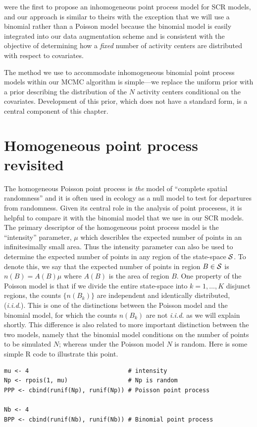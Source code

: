 \citet{borchers_efford:2008} were the first to propose an
inhomogeneous point process model for SCR models, and our approach is
similar to theirs with the exception that we will use a binomial
rather than a Poisson model because the binomial model is
easily integrated into our data augmentation scheme and is consistent
with the objective of determining how a {\it fixed} number of activity
centers are distributed with respect to covariates.

The method we use to accommodate inhomogeneous binomial point process
models within our MCMC algorithm is simple---we
replace the uniform prior with a prior describing the
distribution of
the $N$ activity centers conditional on the covariates. Development of
this prior, which does not have a
standard form, is a central component of this chapter.


\section{Homogeneous point process revisited}

The homogeneous Poisson point process is \emph{the} model of ``complete
spatial randomness'' and it is often used in ecology as a null model
to test for departures from randomness. Given its central role in the
analysis of point procesess, it is helpful to compare it with
the binomial model that we use in our SCR models. The
primary descriptor of the homogeneous point process model is the
``intensity'' parameter, $\mu$ which describles the expected number
of points in an infinitesimally small area. Thus the intensity
parameter can also be used to determine the expected number of points
in any region of the state-space $\cal{S}$. To denote this, we say
that the expected number of points in region $B \in \cal{S}$ is
$n(B) = A(B)\mu$ where $A(B)$ is the area of region $B$.  One property
of the Poisson model is that if we divide the entire state-space into
$k=1,\dots,K$ disjunct regions, the counts $\{n(B_k)\}$ are
independent and identically distributed, ({\it i.i.d.}). This is one
of the distinctions between the Poisson model and the binomial model,
for which the counts $n(B_k)$ are not {\it i.i.d.} as we will explain
shortly. This difference is also related to more important distinction
between the two models, namely that the binomial model
conditions on the number of points to be simulated $N$; whereas under
the Poisson model $N$ is random. Here is some simple R code to
illustrate this point.

\begin{verbatim}
mu <- 4                            # intensity
Np <- rpois(1, mu)                 # Np is random
PPP <- cbind(runif(Np), runif(Np)) # Poisson point process

Nb <- 4
BPP <- cbind(runif(Nb), runif(Nb)) # Binomial point process
\end{verbatim}

